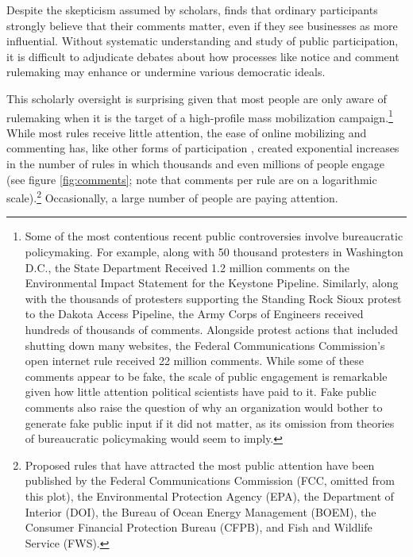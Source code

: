 Despite the skepticism assumed by scholars, \citet{Yackee2015JPART} finds that ordinary participants strongly believe that their comments matter, even if they see businesses as more influential.
Without systematic understanding and study of public participation, it is difficult to adjudicate debates about how processes like notice and comment rulemaking may enhance or undermine various democratic ideals.

This scholarly oversight is surprising given that most people are only aware of rulemaking when it is the target of a high-profile mass mobilization campaign.\footnote{Some of the most contentious recent public controversies involve bureaucratic policymaking. For example, along with 50 thousand protesters in Washington D.C., the State Department Received 1.2 million comments on the Environmental Impact Statement for the Keystone Pipeline. Similarly, along with the thousands of protesters supporting the Standing Rock Sioux protest to the Dakota Access Pipeline, the Army Corps of Engineers received hundreds of thousands of comments. Alongside protest actions that included shutting down many websites, the Federal Communications Commission's open internet rule received 22 million comments. While some of these comments appear to be fake, the scale of public engagement is remarkable given how little attention political scientists have paid to it. Fake public comments also raise the question of why an organization would bother to generate fake public input if it did not matter, as its omission from theories of bureaucratic policymaking would seem to imply. %
} 
While most rules receive little attention, the ease of online mobilizing and commenting has, like other forms of participation \citep{Boulianne2018}, created exponential increases in the number of rules in which thousands and even millions of people engage (see figure \ref{fig:comments}; note that comments per rule are on a logarithmic scale).\footnote{Proposed rules that have attracted the most public attention have been published by the Federal Communications Commission (FCC, omitted from this plot), the Environmental Protection Agency (EPA), the Department of Interior (DOI), the Bureau of Ocean Energy Management (BOEM), the Consumer Financial Protection Bureau (CFPB), and Fish and Wildlife Service (FWS).} Occasionally, a large number of people are paying attention.

